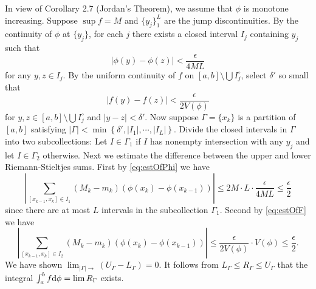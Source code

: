 \begin{exercise}{2.16}
  In view of Corollary 2.7 (Jordan's Theorem),
  we assume that $\phi$ is monotone increasing.
  Suppose $\sup f = M$ and $\{y_j\}_1^L$ are the jump discontinuities.
  By the continuity of $\phi$ at $\{y_j\}$,
  for each $j$ there exists a closed interval $I_j$ containing $y_j$ such that
  \begin{equation}
    \left| \phi(y) - \phi(z) \right| < \frac{\epsilon}{4 M L}
    \label{eq:estOfPhi}
  \end{equation}
  for any $y, z \in I_j$.
  By the uniform continuity of $f$ on $[a,b] \setminus \bigcup I_j^\circ$,
  select $\delta'$ so small that
  \begin{equation}
    \left| f(y) - f(z) \right| < \frac{\epsilon}{2 V(\phi)}
    \label{eq:estOfF}
  \end{equation}
  for $y,z \in [a,b] \setminus \bigcup I_j^\circ$ and $|y-z| < \delta'$.
  Now suppose $\Gamma = \{x_k\}$ is a partition of $[a,b]$ satisfying
  $\left| \Gamma \right| < \min \left\{ \delta', |I_1|, \cdots, |I_L| \right\}$.
  Divide the closed intervals in $\Gamma$ into two subcollections:
  Let  $I \in \Gamma_1$
  if $I$ has nonempty intersection with any $y_j$
  and let $I \in \Gamma_2$ otherwise.
  Next we estimate the difference between the upper and lower Riemann-Stieltjes sums.
  First by \eqref{eq:estOfPhi} we have
  \[
    \left| \sum_{[x_{k-1}, x_k] \in I_1}
    \left( M_k - m_k \right) \left( \phi(x_k) - \phi(x_{k-1}) \right) \right|
    \le 2M \cdot L \cdot \frac{\epsilon}{4ML}
    \le \frac{\epsilon}{2}
  \]
  since there are at most $L$ intervals in the subcollection $\Gamma_1$.
  Second by \eqref{eq:estOfF} we have
  \[
    \left| \sum_{[x_{k-1}, x_k] \in I_2}
    \left( M_k - m_k \right) \left( \phi(x_k) - \phi(x_{k-1}) \right) \right|
    \le \frac{\epsilon}{2V(\phi)} \cdot V(\phi)
    \le \frac{\epsilon}{2}.
  \]
  We have shown $\lim_{|\Gamma| \rightarrow} (U_\Gamma - L_\Gamma) = 0$.
  It follows from $L_\Gamma \le R_\Gamma \le U_\Gamma$ that
  the integral $\int_a^b f \mathrm{d} \phi = \lim R_\Gamma$ exists.
\end{exercise}

